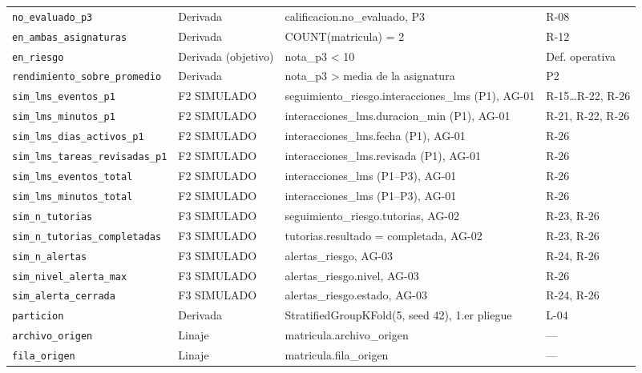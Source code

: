 {\begin{longtable}{>{\raggedright\arraybackslash}p{3.9cm}>{\raggedright\arraybackslash}p{2.3cm}>{\raggedright\arraybackslash}p{6.2cm}>{\raggedright\arraybackslash}p{2.1cm}}
\texttt{no\_evaluado\_p3} & Derivada & calificacion.no\_evaluado, P3 & R-08 \\
\texttt{en\_ambas\_asignaturas} & Derivada & COUNT(matricula) = 2 & R-12 \\
\texttt{en\_riesgo} & Derivada (objetivo) & nota\_p3 < 10 & Def. operativa \\
\texttt{rendimiento\_sobre\_promedio} & Derivada & nota\_p3 > media de la asignatura & P2 \\
\texttt{sim\_lms\_eventos\_p1} & F2 SIMULADO & seguimiento\_riesgo.interacciones\_lms (P1), AG-01 & R-15…R-22, R-26 \\
\texttt{sim\_lms\_minutos\_p1} & F2 SIMULADO & interacciones\_lms.duracion\_min (P1), AG-01 & R-21, R-22, R-26 \\
\texttt{sim\_lms\_dias\_activos\_p1} & F2 SIMULADO & interacciones\_lms.fecha (P1), AG-01 & R-26 \\
\texttt{sim\_lms\_tareas\_revisadas\_p1} & F2 SIMULADO & interacciones\_lms.revisada (P1), AG-01 & R-26 \\
\texttt{sim\_lms\_eventos\_total} & F2 SIMULADO & interacciones\_lms (P1–P3), AG-01 & R-26 \\
\texttt{sim\_lms\_minutos\_total} & F2 SIMULADO & interacciones\_lms (P1–P3), AG-01 & R-26 \\
\texttt{sim\_n\_tutorias} & F3 SIMULADO & seguimiento\_riesgo.tutorias, AG-02 & R-23, R-26 \\
\texttt{sim\_n\_tutorias\_completadas} & F3 SIMULADO & tutorias.resultado = completada, AG-02 & R-23, R-26 \\
\texttt{sim\_n\_alertas} & F3 SIMULADO & alertas\_riesgo, AG-03 & R-24, R-26 \\
\texttt{sim\_nivel\_alerta\_max} & F3 SIMULADO & alertas\_riesgo.nivel, AG-03 & R-26 \\
\texttt{sim\_alerta\_cerrada} & F3 SIMULADO & alertas\_riesgo.estado, AG-03 & R-24, R-26 \\
\texttt{particion} & Derivada & StratifiedGroupKFold(5, seed 42), 1.er pliegue & L-04 \\
\texttt{archivo\_origen} & Linaje & matricula.archivo\_origen & — \\
\texttt{fila\_origen} & Linaje & matricula.fila\_origen & — \\
\bottomrule
\end{longtable}}
